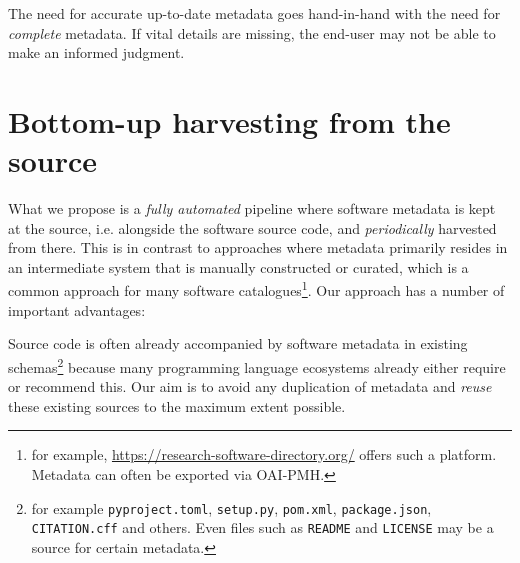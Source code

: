 \documentclass[a4paper,11pt]{article}
\begin{document}
The need for accurate up-to-date metadata goes hand-in-hand with the need for
\emph{complete} metadata. If vital details are missing, the
end-user may not be able to make an informed judgment.


\section{Bottom-up harvesting from the source}

What we propose is a \emph{fully automated} pipeline where software metadata is
kept at the source, i.e. alongside the software source code, and
\emph{periodically} harvested from there. This is in contrast to approaches
where metadata primarily resides in an intermediate system that is manually
constructed or curated, which is a common approach for many
software catalogues\footnote{for example, \url{https://research-software-directory.org/}
offers such a platform. Metadata can often be exported via OAI-PMH.}. Our approach has a number of important advantages:



Source code is often already accompanied by software metadata in existing
schemas\footnote{for example \texttt{pyproject.toml}, \texttt{setup.py}, \texttt{pom.xml}, \texttt{package.json}, \texttt{CITATION.cff} and others. Even files such as \texttt{README} and \texttt{LICENSE} may be a source for certain metadata.} because many programming language ecosystems already either require or
recommend this. Our aim is to avoid any duplication of metadata and
\emph{reuse} these existing sources to the maximum extent possible.

\end{document}
